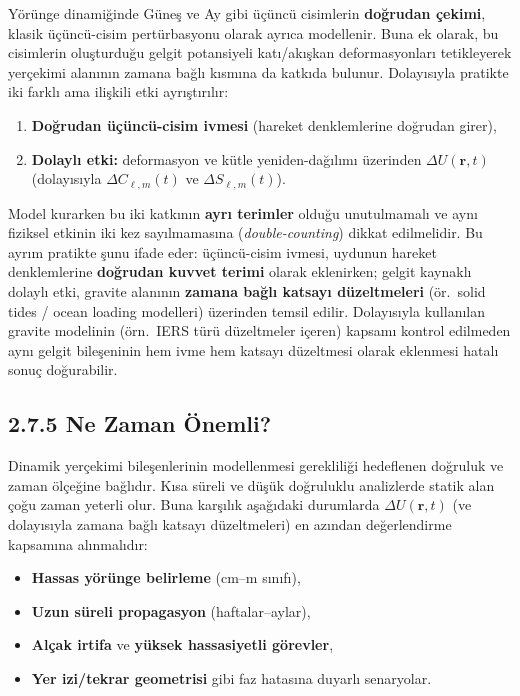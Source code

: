 Yörünge dinamiğinde Güneş ve Ay gibi üçüncü cisimlerin \textbf{doğrudan çekimi},
klasik üçüncü-cisim pertürbasyonu olarak ayrıca modellenir.
Buna ek olarak, bu cisimlerin oluşturduğu gelgit potansiyeli katı/akışkan deformasyonları tetikleyerek
yerçekimi alanının zamana bağlı kısmına da katkıda bulunur.
Dolayısıyla pratikte iki farklı ama ilişkili etki ayrıştırılır:
\begin{enumerate}
    \item \textbf{Doğrudan üçüncü-cisim ivmesi} (hareket denklemlerine doğrudan girer),
    \item \textbf{Dolaylı etki:} deformasyon ve kütle yeniden-dağılımı üzerinden $\Delta U(\mathbf{r},t)$
    (dolayısıyla $\Delta C_{\ell,m}(t)$ ve $\Delta S_{\ell,m}(t)$).
\end{enumerate}
Model kurarken bu iki katkının \textbf{ayrı terimler} olduğu unutulmamalı ve aynı fiziksel etkinin iki kez sayılmamasına (\emph{double-counting}) dikkat edilmelidir. Bu ayrım pratikte şunu ifade eder: üçüncü-cisim ivmesi, uydunun hareket denklemlerine \textbf{doğrudan kuvvet terimi} olarak eklenirken; gelgit kaynaklı dolaylı etki, gravite alanının \textbf{zamana bağlı katsayı düzeltmeleri} (ör.\ solid tides / ocean loading modelleri) üzerinden temsil edilir. Dolayısıyla kullanılan gravite modelinin (örn.\ IERS türü düzeltmeler içeren) kapsamı kontrol edilmeden aynı gelgit bileşeninin hem ivme hem katsayı düzeltmesi olarak eklenmesi hatalı sonuç doğurabilir.

\subsection*{2.7.5 \hspace{0.25em} Ne Zaman Önemli?}
\label{subsec:when_matters}

Dinamik yerçekimi bileşenlerinin modellenmesi gerekliliği hedeflenen doğruluk ve zaman ölçeğine bağlıdır.
Kısa süreli ve düşük doğruluklu analizlerde statik alan çoğu zaman yeterli olur.
Buna karşılık aşağıdaki durumlarda $\Delta U(\mathbf{r},t)$ (ve dolayısıyla zamana bağlı katsayı düzeltmeleri)
en azından değerlendirme kapsamına alınmalıdır:
\begin{itemize}
    \item \textbf{Hassas yörünge belirleme} (cm--m sınıfı),
    \item \textbf{Uzun süreli propagasyon} (haftalar--aylar),
    \item \textbf{Alçak irtifa} ve \textbf{yüksek hassasiyetli görevler},
    \item \textbf{Yer izi/tekrar geometrisi} gibi faz hatasına duyarlı senaryolar.
\end{itemize}

